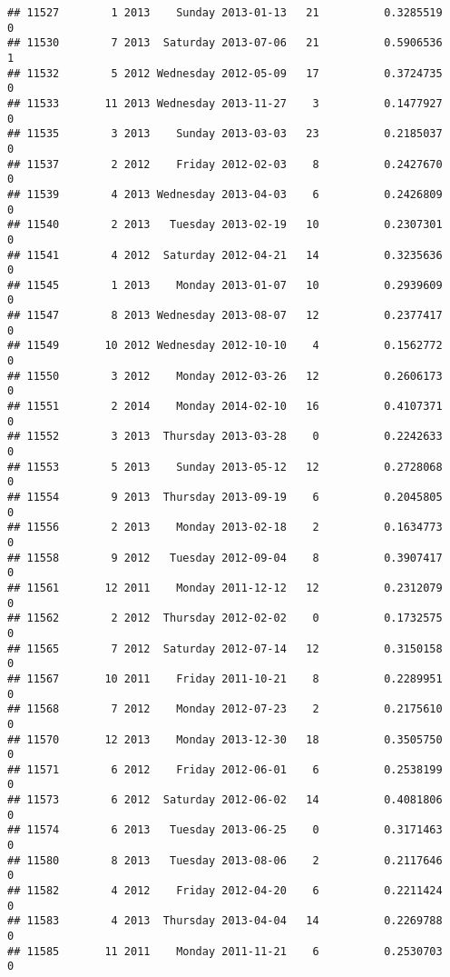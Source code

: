 \documentclass[
]{article}
\begin{document}
\begin{verbatim}
## 11527        1 2013    Sunday 2013-01-13   21          0.3285519             0
## 11530        7 2013  Saturday 2013-07-06   21          0.5906536             1
## 11532        5 2012 Wednesday 2012-05-09   17          0.3724735             0
## 11533       11 2013 Wednesday 2013-11-27    3          0.1477927             0
## 11535        3 2013    Sunday 2013-03-03   23          0.2185037             0
## 11537        2 2012    Friday 2012-02-03    8          0.2427670             0
## 11539        4 2013 Wednesday 2013-04-03    6          0.2426809             0
## 11540        2 2013   Tuesday 2013-02-19   10          0.2307301             0
## 11541        4 2012  Saturday 2012-04-21   14          0.3235636             0
## 11545        1 2013    Monday 2013-01-07   10          0.2939609             0
## 11547        8 2013 Wednesday 2013-08-07   12          0.2377417             0
## 11549       10 2012 Wednesday 2012-10-10    4          0.1562772             0
## 11550        3 2012    Monday 2012-03-26   12          0.2606173             0
## 11551        2 2014    Monday 2014-02-10   16          0.4107371             0
## 11552        3 2013  Thursday 2013-03-28    0          0.2242633             0
## 11553        5 2013    Sunday 2013-05-12   12          0.2728068             0
## 11554        9 2013  Thursday 2013-09-19    6          0.2045805             0
## 11556        2 2013    Monday 2013-02-18    2          0.1634773             0
## 11558        9 2012   Tuesday 2012-09-04    8          0.3907417             0
## 11561       12 2011    Monday 2011-12-12   12          0.2312079             0
## 11562        2 2012  Thursday 2012-02-02    0          0.1732575             0
## 11565        7 2012  Saturday 2012-07-14   12          0.3150158             0
## 11567       10 2011    Friday 2011-10-21    8          0.2289951             0
## 11568        7 2012    Monday 2012-07-23    2          0.2175610             0
## 11570       12 2013    Monday 2013-12-30   18          0.3505750             0
## 11571        6 2012    Friday 2012-06-01    6          0.2538199             0
## 11573        6 2012  Saturday 2012-06-02   14          0.4081806             0
## 11574        6 2013   Tuesday 2013-06-25    0          0.3171463             0
## 11580        8 2013   Tuesday 2013-08-06    2          0.2117646             0
## 11582        4 2012    Friday 2012-04-20    6          0.2211424             0
## 11583        4 2013  Thursday 2013-04-04   14          0.2269788             0
## 11585       11 2011    Monday 2011-11-21    6          0.2530703             0

\end{verbatim}
\end{document}
